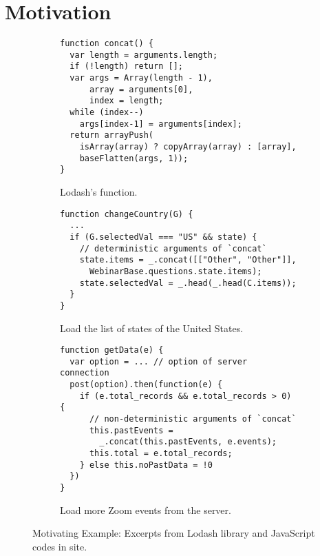 \section{Motivation}\label{sec:motivation}

\begin{figure}[t]
  \centering
  \begin{subfigure}[t]{0.5\textwidth}
    \begin{lstlisting}[style=myJSstyle]
function concat() {
  var length = arguments.length;
  if (!length) return [];
  var args = Array(length - 1),
      array = arguments[0],
      index = length;
  while (index--)
    args[index-1] = arguments[index];
  return arrayPush(
    isArray(array) ? copyArray(array) : [array],
    baseFlatten(args, 1));
}
    \end{lstlisting}
    \vspace*{-1em}
    \caption{Lodash's  function.}
    \label{fig:concat}
  \end{subfigure}
  \begin{subfigure}[t]{0.5\textwidth}
    \begin{lstlisting}[style=myJSstyle,firstnumber=13]
function changeCountry(G) {
  ...
  if (G.selectedVal === "US" && state) {
    // deterministic arguments of `concat`
    state.items = _.concat([["Other", "Other"]],
      WebinarBase.questions.state.items);
    state.selectedVal = _.head(_.head(C.items));
  }
}
    \end{lstlisting}
    \vspace*{-1em}
    \caption{Load the list of states of the United States.}
    \label{fig:changeCountry}
  \end{subfigure}
  \begin{subfigure}[t]{0.5\textwidth}
    \begin{lstlisting}[style=myJSstyle,firstnumber=22]
function getData(e) {
  var option = ... // option of server connection
  post(option).then(function(e) {
    if (e.total_records && e.total_records > 0) {
      // non-deterministic arguments of `concat`
      this.pastEvents =
        _.concat(this.pastEvents, e.events);
      this.total = e.total_records;
    } else this.noPastData = !0
  })
}
    \end{lstlisting}
    \vspace*{-1em}
    \caption{Load more Zoom events from the server.}
    \label{fig:getData}
  \end{subfigure}
  \vspace*{-1em}
  \caption{Motivating Example: Excerpts from Lodash library and JavaScript codes
  in  site.}
  \label{fig:example}
\end{figure}

